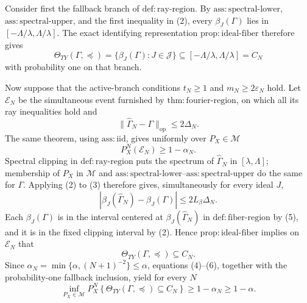 Consider first the fallback branch of \(\mathrm{def:ray\text{-}region}\).  By \(\mathrm{ass:spectral\text{-}lower}\), \(\mathrm{ass:spectral\text{-}upper}\), and the first inequality in (2), every \(\beta_J(\Gamma)\) lies in \([ -\Lambda/\lambda,\Lambda/\lambda]\).  The exact identifying representation \(\mathrm{prop:ideal\text{-}fiber}\) therefore gives
\[
 \Theta_{TY}(\Gamma,\preceq)
 =\{\beta_J(\Gamma):J\in\mathcal J\}
 \subseteq[-\Lambda/\lambda,\Lambda/\lambda]
 =C_N
\]
with probability one on that branch.

Now suppose that the active-branch conditions \(t_N\ge1\) and \(m_N\ge2\varepsilon_N\) hold.  Let \(\mathcal E_N\) be the simultaneous event furnished by \(\mathrm{thm:fourier\text{-}region}\), on which all its ray inequalities hold and
\[
 \lVert\widehat\Gamma_N-\Gamma\rVert_{\mathrm{op}}
 \le 2\Delta_N.
\tag{3}
\]
The same theorem, using \(\mathrm{ass:iid}\), gives uniformly over \(P_X\in\mathcal M\)
\[
 P_X^N(\mathcal E_N)\ge1-\alpha_N.
\tag{4}
\]
Spectral clipping in \(\mathrm{def:ray\text{-}region}\) puts the spectrum of \(\widehat\Gamma_N\) in \([\lambda,\Lambda]\); membership of \(P_X\) in \(\mathcal M\) and \(\mathrm{ass:spectral\text{-}lower}\)--\(\mathrm{ass:spectral\text{-}upper}\) do the same for \(\Gamma\).  Applying (2) to (3) therefore gives, simultaneously for every ideal \(J\),
\[
 |\beta_J(\widehat\Gamma_N)-\beta_J(\Gamma)|
 \le 2L_\beta\Delta_N.
\tag{5}
\]
Each \(\beta_J(\Gamma)\) is in the interval centered at \(\beta_J(\widehat\Gamma_N)\) in \(\mathrm{def:fiber\text{-}region}\) by (5), and it is in the fixed clipping interval by (2).  Hence \(\mathrm{prop:ideal\text{-}fiber}\) implies on \(\mathcal E_N\) that
\[
 \Theta_{TY}(\Gamma,\preceq)\subseteq C_N.
\tag{6}
\]
Since \(\alpha_N=\min\{\alpha,(N+1)^{-2}\}\le\alpha\), equations (4)--(6), together with the probability-one fallback inclusion, yield for every \(N\)
\[
 \inf_{P_X\in\mathcal M}
 P_X^N\!\left\{\Theta_{TY}(\Gamma,\preceq)\subseteq C_N\right\}
 \ge1-\alpha_N\ge1-\alpha.
\]

